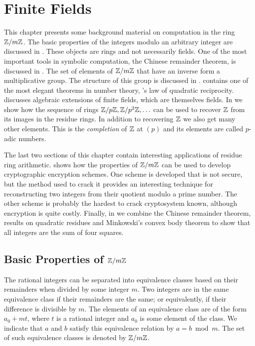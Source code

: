 \chapter{Finite Fields}
\label{Finite:Fields:Chap}

This chapter presents some background material on computation in the
ring $\mathbb{Z}/m\mathbb{Z}$.  The basic properties of the integers modulo an
arbitrary integer are discussed in .  These
objects are rings and not necessarily fields.  One of the most
important tools in symbolic computation, the Chinese remainder
theorem, is discussed in .  The
set of elements of $\mathbb{Z}/m\mathbb{Z}$ that have an inverse form a multiplicative
group.  The structure of this group is discussed in
.  
contains one of the most elegant theorems in number theory, {\Gauss}'s
law of quadratic reciprocity.  discusses
algebraic extensions of finite fields, which are themselves fields.
In  we show how the sequence of rings
$\mathbb{Z}/p\mathbb{Z}, \mathbb{Z}/p^2\mathbb{Z}, \ldots$ can be used to recover $\mathbb{Z}$ from its images
in the residue rings.  In addition to recovering $\mathbb{Z}$ we also get many
other elements.  This is the {\em completion} of $\mathbb{Z}$ at $(p)$ and its
elements are called $p$-adic numbers.

The last two sections of this chapter contain interesting applications
of residue ring arithmetic.   shows how the
properties of $\mathbb{Z}/m\mathbb{Z}$ can be used to develop cryptographic encryption
schemes.  One scheme is developed that is not secure, but the method
used to crack it provides an interesting technique for reconstructing
two integers from their quotient modulo a prime number.  The other
scheme is probably the hardest to crack cryptosystem known, although
encryption is quite costly.  Finally, in 
we combine the Chinese remainder theorem, results on quadratic
residues and Minkowski's convex body theorem to show that all integers
are the sum of four squares.

\section{Basic Properties of \texorpdfstring{${\protect\mathbb{Z}}/m{\protect\mathbb{Z}}$}{Z/mZ}}
\label{FF:Basic:Sec}

The rational integers can be separated into equivalence classes based
on their remainders when divided by some integer $m$.  Two integers
are in the same equivalence class if their remainders are the same; or
equivalently, if their difference is divisible by $m$.  The elements
of an equivalence class are of the form $a_0 + m t$, where $t$ is a
rational integer and $a_0$ is some element of the class.  We indicate
that $a$ and $b$ satisfy this equivalence relation by $a = b\bmod{m}$.
The set of such equivalence classes is denoted by $\mathbb{Z}/m\mathbb{Z}$.


